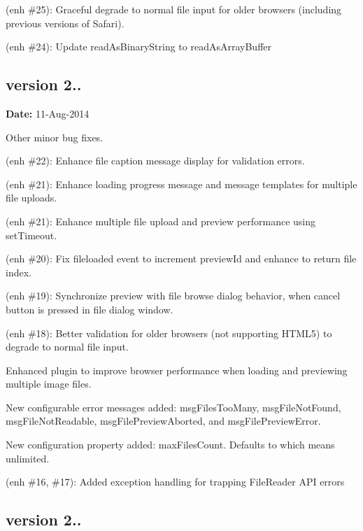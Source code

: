 \begin{DoxyItemize}
\item (enh \#25)\+: Graceful degrade to normal file input for older browsers (including previous versions of Safari).
\item (enh \#24)\+: Update read\+As\+Binary\+String to read\+As\+Array\+Buffer
\end{DoxyItemize}

\subsection*{version 2..}

{\bfseries Date\+:} 11-\/\+Aug-\/2014


\begin{DoxyItemize}
\item Other minor bug fixes.
\item (enh \#22)\+: Enhance file caption message display for validation errors.
\item (enh \#21)\+: Enhance loading progress message and message templates for multiple file uploads.
\item (enh \#21)\+: Enhance multiple file upload and preview performance using set\+Timeout.
\item (enh \#20)\+: Fix {\ttfamily fileloaded} event to increment {\ttfamily preview\+Id} and enhance to return file index.
\item (enh \#19)\+: Synchronize preview with file browse dialog behavior, when cancel button is pressed in file dialog window.
\item (enh \#18)\+: Better validation for older browsers (not supporting H\+T\+M\+L5) to degrade to normal file input.
\item Enhanced plugin to improve browser performance when loading and previewing multiple image files.
\item New configurable error messages added\+: {\ttfamily msg\+Files\+Too\+Many}, {\ttfamily msg\+File\+Not\+Found}, {\ttfamily msg\+File\+Not\+Readable}, {\ttfamily msg\+File\+Preview\+Aborted}, and {\ttfamily msg\+File\+Preview\+Error}.
\item New configuration property added\+: {\ttfamily max\+Files\+Count}. Defaults to {} which means unlimited.
\item (enh \#16, \#17)\+: Added exception handling for trapping File\+Reader A\+PI errors
\end{DoxyItemize}

\subsection*{version 2..}

